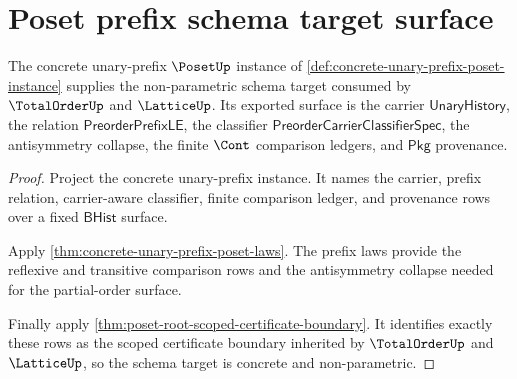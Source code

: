 \section{Poset prefix schema target surface}
\label{sec:poset-prefix-schema-target-surface}

\begin{theorem}
\label{thm:poset-prefix-schema-target-surface}
The concrete unary-prefix $\PosetUp$ instance of
\autoref{def:concrete-unary-prefix-poset-instance} supplies the
non-parametric schema target consumed by $\TotalOrderUp$ and $\LatticeUp$.
Its exported surface is the carrier $\mathsf{UnaryHistory}$, the relation
$\mathsf{PreorderPrefixLE}$, the classifier
$\mathsf{PreorderCarrierClassifierSpec}$, the antisymmetry collapse, the
finite $\Cont$ comparison ledgers, and $\mathsf{Pkg}$ provenance.
\end{theorem}
\begin{proof}
Project the concrete unary-prefix instance. It names the carrier, prefix
relation, carrier-aware classifier, finite comparison ledger, and provenance
rows over a fixed $\mathsf{BHist}$ surface.

Apply \autoref{thm:concrete-unary-prefix-poset-laws}. The prefix laws provide
the reflexive and transitive comparison rows and the antisymmetry collapse
needed for the partial-order surface.

Finally apply \autoref{thm:poset-root-scoped-certificate-boundary}. It
identifies exactly these rows as the scoped certificate boundary inherited by
$\TotalOrderUp$ and $\LatticeUp$, so the schema target is concrete and
non-parametric.
\end{proof}
